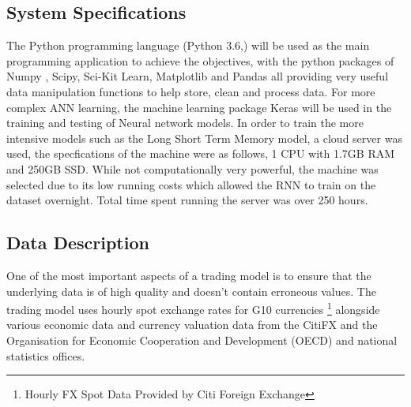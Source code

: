 \documentclass[11pt]{article}
\begin{document}
\subsection{System Specifications}
The Python programming language (Python 3.6,\cite{McKinney1976}) will be used as the main programming application to achieve the objectives, with the python packages of Numpy \cite{VanDerWalt2011}, Scipy\cite{Tobergte2013}, Sci-Kit Learn\cite{Geron2017}, Matplotlib\cite{Wood2015} and Pandas\cite{Reiff2002} all providing very useful data manipulation functions to help store, clean and process data. For more complex ANN learning, the machine learning package Keras  \cite{Chollet2015} will be used in the training and testing of Neural network models. In order to train the more intensive models such as the Long Short Term Memory model, a cloud server was used, the specfications of the machine were as follows, 1 CPU with 1.7GB RAM and 250GB SSD. While not computationally very powerful, the machine was selected due to its low running costs which allowed the RNN to train on the dataset overnight. Total time spent running the server was over 250 hours. 


\subsection{Data Description}
One of the most important aspects of a trading model is to ensure that the underlying data is of high quality and doesn't contain erroneous values. The trading model uses hourly spot exchange rates for G10 currencies \footnote{Hourly FX Spot Data Provided by Citi Foreign Exchange} alongside various economic data and currency valuation data from the CitiFX and the Organisation for Economic Cooperation and Development (OECD) and national statistics offices.
\end{document}
